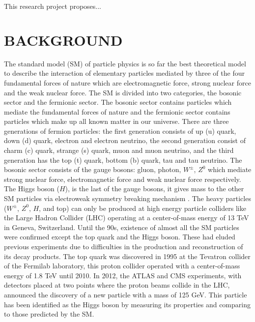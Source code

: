 \documentclass[final,12p]{article}
\begin{document}
  \vspace{0.5cm}
   
  This research project proposes...     

  \hspace{2pt}
\vfill



\newpage
\section{BACKGROUND}


The standard model (SM) of particle physics is so far the best theoretical model to describe the interaction of elementary particles mediated by three of the four fundamental forces of nature which are electromagnetic force, strong nuclear force and the weak nuclear force. The SM is divided into two categories, the bosonic sector and the fermionic sector.
The bosonic sector contains particles which mediate the fundamental forces of nature and the fermionic sector contains particles which make up all known matter in our universe.
There are three generations of fermion particles: the first generation consists of up (u) quark, down (d) quark, electron and electron neutrino, the second generation consist of charm (c) quark, strange (s) quark, muon and muon neutrino, and the third generation has the top (t) quark, bottom (b) quark, tau and tau neutrino.
The bosonic sector consists of the gauge bosons: gluon, photon, $W^{\pm}$, $Z^0$ which mediate strong nuclear force, electromagnetic force and weak nuclear force respectively.
The Higgs boson ($H$), is the last of the gauge bosons, it gives mass to the other SM particles via electroweak symmetry breaking mechanism \cite{Chatrchyan:2012xdj}.
The heavy particles ($W^{\pm}$, $Z^0$, $H$, and top) can only be produced at high energy particle colliders like the Large Hadron Collider (LHC) operating at a center-of-mass energy of 13 TeV in Geneva, Switzerland.
Until the 90s, existence of almost all the SM particles were confirmed except the top quark and the Higgs boson. 
These had eluded previous experiments due to difficulties in the production and reconstruction of its decay products.
The top quark was discovered in 1995 at the Tevatron collider of the Fermilab laboratory, this proton collider operated with a center-of-mass energy of 1.8 TeV until 2010.
In 2012, the ATLAS and CMS experiments, with detectors placed at two points where the proton beams collide in the LHC, announced the discovery of a new particle with a mass of 125 GeV.
This particle has been identified as the Higgs boson by measuring its properties and comparing to those predicted by the SM.
\end{document}
